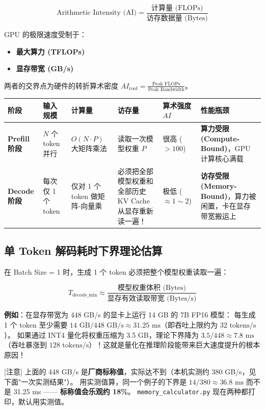 \[
\text{Arithmetic Intensity (AI)} = \frac{\text{计算量 (FLOPs)}}{\text{访存数据量 (Bytes)}}
\]

GPU 的极限速度受制于：
\begin{itemize}
  \item \textbf{最大算力 (TFLOPs)}
  \item \textbf{显存带宽 (GB/s)}
\end{itemize}

两者的交界点为硬件的转折算术密度 $AI_{\text{roof}} = \frac{\text{Peak FLOPs}}{\text{Peak Bandwidth}}$。

\begin{center}
\small
\begin{tabularx}{\textwidth}{l X X X X X }
\toprule
\textbf{阶段} & \textbf{输入规模} & \textbf{计算量} & \textbf{访存量} & \textbf{算术强度 $AI$} & \textbf{性能瓶颈} \\
\midrule
\textbf{Prefill 阶段} & $N$ 个 token 并行 & $O(N \cdot P)$ 大矩阵乘法 & 读取一次模型权重 $P$ & 很高 ($> 100$) & \textbf{算力受限 (Compute-Bound)}，GPU 计算核心满载 \\
\textbf{Decode 阶段} & 每次仅 1 个 token & 仅对 1 个 token 做矩阵-向量乘 & 必须把全部模型权重和全部历史 KV Cache 从显存重新读一遍！ & 极低 ($\approx 1 \sim 2$) & \textbf{访存受限 (Memory-Bound)}，算力被闲置，卡在显存带宽搬运上 \\
\bottomrule
\end{tabularx}
\end{center}

\subsection{单 Token 解码耗时下界理论估算}

在 Batch Size = 1 时，生成 1 个 token 必须把整个模型权重读取一遍：

\[
T_{\text{decode\_min}} \approx \frac{\text{模型权重体积 (Bytes)}}{\text{显存有效读取带宽 (Bytes/s)}}
\]

\begin{noteBox}[核心导读与背景]
\textbf{例如}：在显存带宽为 448 GB/s 的显卡上运行 14 GB 的 7B FP16 模型：
每生成 1 个 token 至少需要 $14 \text{ GB} / 448 \text{ GB/s} \approx 31.25 \text{ ms}$（即吞吐上限约为 $32 \text{ tokens/s}$）。
如果通过 INT4 量化将权重压缩为 3.5 GB，理论下界降为 $3.5 / 448 \approx 7.8 \text{ ms}$（吞吐暴涨到 $128 \text{ tokens/s}$）！这就是量化在推理阶段能带来巨大速度提升的根本原因！

{}[注意] 上面的 448 GB/s 是\textbf{厂商标称值}，实际达不到（本机实测约 380 GB/s，见下面"一次实测结果"）。
用实测值算，同一个例子的下界是 $14/380 \approx 36.8 \text{ ms}$ 而不是 31.25 ms —— \textbf{标称值会乐观约 18\%}。
\texttt{memory\_calculator.py} 现在两种都打印，默认用实测值。
\end{noteBox}

